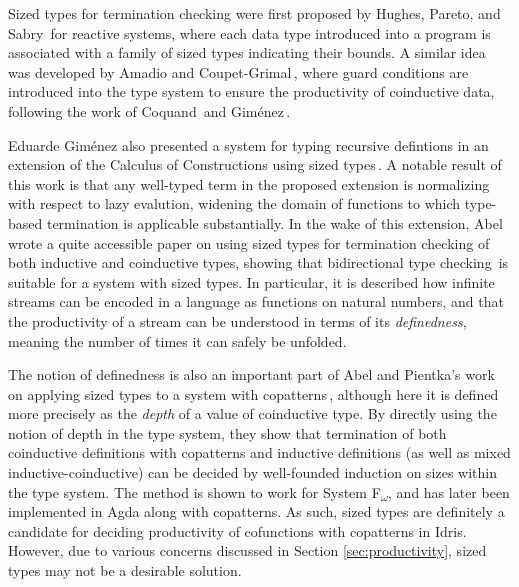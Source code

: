 Sized types for termination checking were first proposed by Hughes, Pareto, and Sabry\,\citep{Hughes96} for reactive systems, where each data type introduced into a program is associated with a family of sized types indicating their bounds. A similar idea was developed by Amadio and Coupet-Grimal\,\citep{Amadio98}, where guard conditions are introduced into the type system to ensure the productivity of coinductive data, following the work of Coquand\,\citep{Coquand94} and Gim\'{e}nez\,\citep{Gimenez95}.

Eduarde Gim\'{e}nez also presented a system for typing recursive defintions in an extension of the Calculus of Constructions using sized types\,\citep{Gimenez98structuralrecursive}. A notable result of this work is that any well-typed term in the proposed extension is normalizing with respect to lazy evalution, widening the domain of functions to which type-based termination is applicable substantially. In the wake of this extension, Abel\,\citep{Abel99terminationchecking} wrote a quite accessible paper on using sized types for termination checking of both inductive and coinductive types, showing that bidirectional type checking\,\citep{Pierce00} is suitable for a system with sized types. In particular, it is described how infinite streams can be encoded in a language as functions on natural numbers, and that the productivity of a stream can be understood in terms of its \emph{definedness}, meaning the number of times it can safely be unfolded.

The notion of definedness is also an important part of Abel and Pientka's work on applying sized types to a system with copatterns\,\citep{Abel13Wellfounded}, although here it is defined more precisely as the \emph{depth} of a value of coinductive type. By directly using the notion of depth in the type system, they show that termination of both coinductive definitions with copatterns and inductive definitions (as well as mixed inductive-coinductive) can be decided by well-founded induction on sizes within the type system. The method is shown to work for System F\textsubscript{$\omega$}, and has later been implemented in Agda along with copatterns. As such, sized types are definitely a candidate for deciding productivity of cofunctions with copatterns in Idris. However, due to various concerns discussed in Section \ref{sec:productivity}, sized types may not be a desirable solution.

